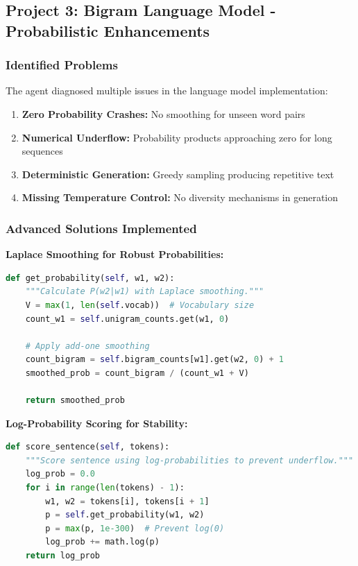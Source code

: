 \documentclass[12pt, a4paper]{article}
\begin{document}
\subsection{Project 3: Bigram Language Model - Probabilistic Enhancements}

\subsubsection{Identified Problems}
The agent diagnosed multiple issues in the language model implementation:

\begin{enumerate}
    \item \textbf{Zero Probability Crashes:} No smoothing for unseen word pairs
    \item \textbf{Numerical Underflow:} Probability products approaching zero for long sequences
    \item \textbf{Deterministic Generation:} Greedy sampling producing repetitive text
    \item \textbf{Missing Temperature Control:} No diversity mechanisms in generation
\end{enumerate}

\subsubsection{Advanced Solutions Implemented}

\textbf{Laplace Smoothing for Robust Probabilities:}

\begin{lstlisting}[language=Python, caption=Laplace Smoothing Implementation]
def get_probability(self, w1, w2):
    """Calculate P(w2|w1) with Laplace smoothing."""
    V = max(1, len(self.vocab))  # Vocabulary size
    count_w1 = self.unigram_counts.get(w1, 0)
    
    # Apply add-one smoothing
    count_bigram = self.bigram_counts[w1].get(w2, 0) + 1
    smoothed_prob = count_bigram / (count_w1 + V)
    
    return smoothed_prob
\end{lstlisting}

\textbf{Log-Probability Scoring for Stability:}

\begin{lstlisting}[language=Python, caption=Log-Probability Sequence Scoring]
def score_sentence(self, tokens):
    """Score sentence using log-probabilities to prevent underflow."""
    log_prob = 0.0
    for i in range(len(tokens) - 1):
        w1, w2 = tokens[i], tokens[i + 1]
        p = self.get_probability(w1, w2)
        p = max(p, 1e-300)  # Prevent log(0)
        log_prob += math.log(p)
    return log_prob
\end{lstlisting}
\end{document}
